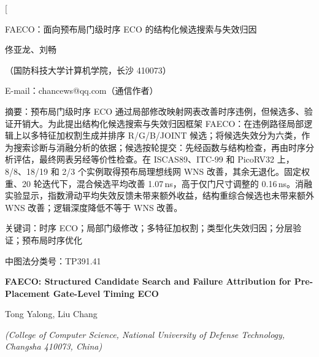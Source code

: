 \documentclass[twocolumn,10pt,fontset=windows]{ctexart}
\let\songti\songfamily\let\heiti\heifamily\let\fangsong\fangfamily
\begin{document}
\pagestyle{plain}

\twocolumn[
\vspace*{-0.25cm}
\begin{center}
{\heiti{} FAECO：面向预布局门级时序 ECO 的结构化候选搜索与失效归因}\par
\vspace{6pt}
{\fangsong{} 佟亚龙、刘畅}\par
\vspace{4pt}
{\songti\fontsize{8}{12}\selectfont（国防科技大学计算机学院，长沙 410073）}\par\vspace{2pt}
{\songti\fontsize{8}{12}\selectfont E-mail：chancews@qq.com（通信作者）}\par
\vspace{6pt}
\end{center}
\begin{flushleft}
  {\heiti\fontsize{8.5}{13}\selectfont 摘\quad 要：}{\songti\fontsize{8.5}{13}\selectfont 预布局门级时序 ECO 通过局部修改映射网表改善时序违例，但候选多、验证开销大。为此提出结构化候选搜索与失效归因框架 FAECO：在违例路径局部逻辑上以多特征加权割生成并排序 R/G/B/JOINT 候选；将候选失效分为六类，作为搜索诊断与消融分析的依据；候选按轮提交：先经函数与结构检查，再由时序分析评估，最终网表另经等价性检查。在 ISCAS89、ITC-99 和 PicoRV32 上，8/8、18/19 和 2/3 个实例取得预布局理想线网 WNS 改善，其余无退化。固定权重、20 轮迭代下，混合候选平均改善 1.07\,ns，高于仅门尺寸调整的 0.16\,ns。消融实验显示，指数滑动平均失效反馈未带来额外收益，结构重综合候选也未带来额外 WNS 改善；逻辑深度降低不等于 WNS 改善。}
\par
\vspace{4pt}
{\heiti\fontsize{8.5}{13}\selectfont 关键词：}{\songti\fontsize{8.5}{13}\selectfont 时序 ECO；局部门级修改；多特征加权割；类型化失效归因；分层验证；预布局时序优化}\par
\vspace{2pt}
{\songti\fontsize{8.5}{13}\selectfont 中图法分类号：TP391.41}\par
\vspace{3pt}
\end{flushleft}
\vspace{2pt}
\begin{center}
{\bfseries\fontsize{12.5}{16}\selectfont FAECO: Structured Candidate Search and Failure Attribution for Pre-Placement Gate-Level Timing ECO}\par
\vspace{3pt}
{\normalsize Tong Yalong, Liu Chang\par}
\vspace{3pt}
{\small \itshape (College of Computer Science, National University of Defense Technology, Changsha 410073, China)}\par
\vspace{4pt}
\end{center}
\end{document}
